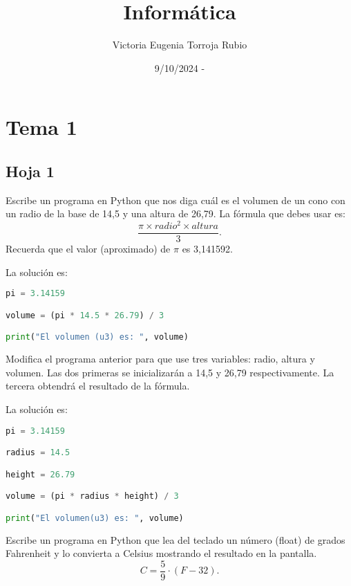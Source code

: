 \documentclass{article}
\begin{document}
\title{Informática}
\author{Victoria Eugenia Torroja Rubio}
\date{9/10/2024 - }

\maketitle

\section{Tema 1}

\subsection{Hoja 1}

\begin{ej}
Escribe un programa en Python que nos diga cuál es el volumen de un cono con un radio de la base de 14,5 y una altura de 26,79. La fórmula que debes usar es:
\[\frac{\pi \times radio^2 \times altura}{3} .\]
Recuerda que el valor (aproximado) de $\displaystyle \pi $  es 3,141592.
\end{ej}

\begin{sol}
La solución es:
\begin{lstlisting}[language = Python]
pi = 3.14159

volume = (pi * 14.5 * 26.79) / 3

print("El volumen (u3) es: ", volume)
\end{lstlisting}
\end{sol}

\begin{ej}
Modifica el programa anterior para que use tres variables: radio, altura y volumen. Las dos primeras se inicializarán a 14,5 y 26,79 respectivamente. La tercera obtendrá el resultado de la fórmula.
\end{ej}

\begin{sol}
La solución es:
\begin{lstlisting}[language = Python]
pi = 3.14159

radius = 14.5

height = 26.79

volume = (pi * radius * height) / 3

print("El volumen(u3) es: ", volume)
\end{lstlisting}
\end{sol}

\begin{ej}
Escribe un programa en Python que lea del teclado un número (float) de grados Fahrenheit y lo convierta a Celsius mostrando el resultado en la pantalla.
\[C = \frac{5}{9} \cdot \left(F - 32\right) .\]
\end{ej}
\end{document}
